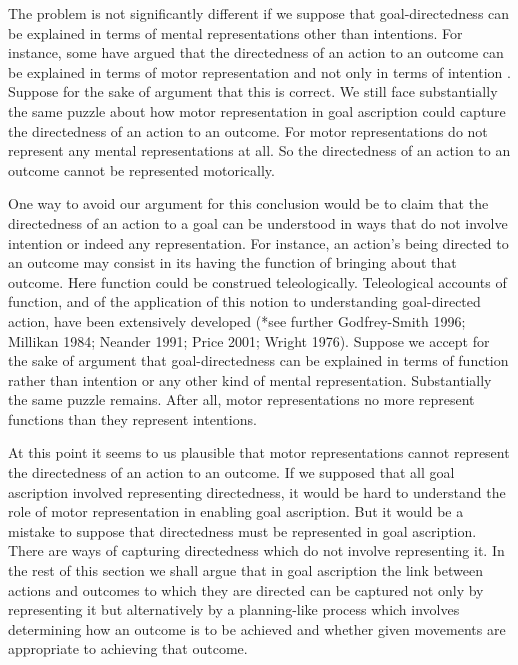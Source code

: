 \documentclass[12pt,\papersize]{extarticle}
\begin{document}
The problem is not significantly different if we suppose that goal-directedness can be explained in terms of mental representations other than intentions.  For instance, some have argued that the directedness of an action to an outcome can be explained in terms of motor representation and not only in terms of intention \citep{butterfill:2012_intention}.  Suppose for the sake of argument that this is correct. We still face substantially the same puzzle about how motor representation in goal ascription could capture the directedness of an action to an outcome.  For motor representations do not represent any mental representations at all.  So the directedness of an action to an outcome cannot be represented motorically.

One way to avoid our argument for this conclusion would be to claim that the directedness of an action to a goal can be understood in ways that do not involve intention or indeed any representation.  For instance, an action's being directed to an outcome may consist in its having the function of bringing about that outcome. Here function could be construed teleologically. Teleological accounts of function, and of the application of this notion to understanding goal-directed action, have been extensively developed (*see further Godfrey-Smith 1996; Millikan 1984; Neander 1991; Price 2001; Wright 1976). Suppose we accept for the sake of argument  that goal-directedness can be explained in terms of function rather than intention or any other kind of mental representation.  Substantially the same puzzle remains. After all, motor representations no more represent functions than they represent intentions.

At this point it seems to us plausible that motor representations cannot represent the directedness of an action to an outcome. If we supposed that all goal ascription involved representing directedness, it would be hard to understand the role of motor representation in enabling goal ascription.  But it would be a mistake to suppose that directedness must be represented in goal ascription.  There are ways of capturing directedness which do not involve representing it.  In the rest of this section we shall argue that in goal ascription the link between actions and outcomes to which they are directed can be captured not only by representing it but alternatively by a planning-like process which involves determining how an outcome is to be achieved and whether given movements are appropriate to achieving that outcome.  
\end{document}
